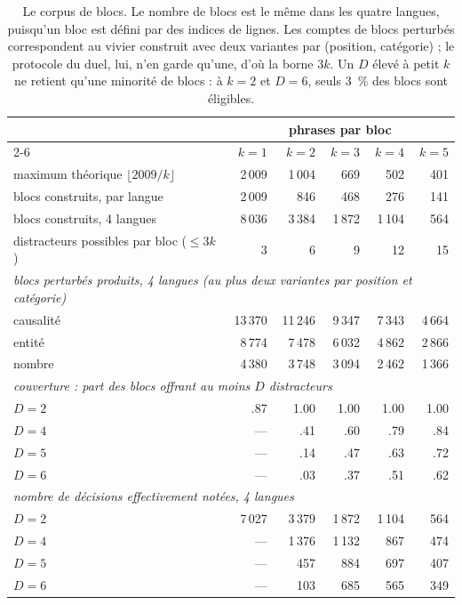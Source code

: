 \documentclass[11pt]{article}
\begin{document}
\begin{table}[t]
\centering\small
\begin{tabular}{l rrrrr}
\toprule
& \multicolumn{5}{c}{phrases par bloc}\\
\cmidrule(lr){2-6}
& $k{=}1$ & $k{=}2$ & $k{=}3$ & $k{=}4$ & $k{=}5$\\
\midrule
maximum théorique $\lfloor 2009/k \rfloor$   & 2\,009 & 1\,004 & 669 & 502 & 401\\
blocs construits, par langue                 & 2\,009 & 846 & 468 & 276 & 141\\
blocs construits, 4 langues                  & 8\,036 & 3\,384 & 1\,872 & 1\,104 & 564\\
distracteurs possibles par bloc ($\le 3k$)   & 3 & 6 & 9 & 12 & 15\\
\midrule
\multicolumn{6}{l}{\emph{blocs perturbés produits, 4 langues (au plus deux variantes par position et catégorie)}}\\
\quad causalité & 13\,370 & 11\,246 & 9\,347 & 7\,343 & 4\,664\\
\quad entité    & 8\,774  & 7\,478  & 6\,032 & 4\,862 & 2\,866\\
\quad nombre    & 4\,380  & 3\,748  & 3\,094 & 2\,462 & 1\,366\\
\midrule
\multicolumn{6}{l}{\emph{couverture : part des blocs offrant au moins $D$ distracteurs}}\\
\quad $D=2$ & .87 & 1.00 & 1.00 & 1.00 & 1.00\\
\quad $D=4$ & --- & .41 & .60 & .79 & .84\\
\quad $D=5$ & --- & .14 & .47 & .63 & .72\\
\quad $D=6$ & --- & .03 & .37 & .51 & .62\\
\midrule
\multicolumn{6}{l}{\emph{nombre de décisions effectivement notées, 4 langues}}\\
\quad $D=2$ & 7\,027 & 3\,379 & 1\,872 & 1\,104 & 564\\
\quad $D=4$ & --- & 1\,376 & 1\,132 & 867 & 474\\
\quad $D=5$ & --- & 457 & 884 & 697 & 407\\
\quad $D=6$ & --- & 103 & 685 & 565 & 349\\
\bottomrule
\end{tabular}
\caption{Le corpus de blocs. Le nombre de blocs est le même dans les quatre langues, puisqu'un bloc est défini par des indices de lignes. Les comptes de blocs perturbés correspondent au vivier construit avec deux variantes par (position, catégorie) ; le protocole du duel, lui, n'en garde qu'une, d'où la borne $3k$. Un $D$ élevé à petit $k$ ne retient qu'une minorité de blocs : à $k{=}2$ et $D{=}6$, seuls 3~\% des blocs sont éligibles.}
\label{tab:donnees}
\end{table}
\end{document}
